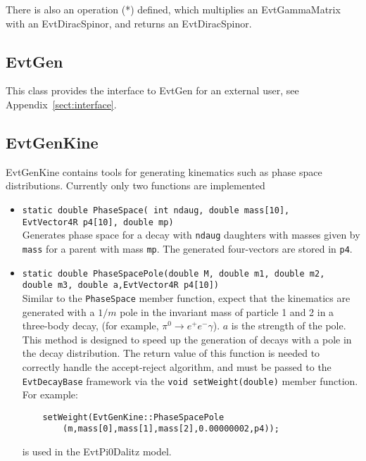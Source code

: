 There is also an operation (*) defined, which multiplies 
an EvtGammaMatrix with an EvtDiracSpinor, and returns an
EvtDiracSpinor. 


\subsection{EvtGen}


This class provides the interface to EvtGen for an external user,
see Appendix~\ref{sect:interface}.


\subsection{EvtGenKine}

EvtGenKine contains tools for generating kinematics such
as phase space distributions. Currently only two functions are
implemented

\begin{itemize}
\item {\tt static double PhaseSpace( int ndaug, double mass[10],}\\
      {\tt EvtVector4R p4[10], double mp)}\\
      Generates phase space for a decay with {\tt ndaug} daughters
      with masses given by {\tt mass} for a parent with mass {\tt mp}.
      The generated four-vectors are stored in {\tt p4}.
\item {\tt static double PhaseSpacePole(double M, double m1, double m2,}\\
      {\tt double m3, double a,EvtVector4R p4[10])}\\
      Similar to the {\tt PhaseSpace} member function, expect that
      the kinematics are generated with a $1/m$ pole in the 
      invariant mass of particle 1 and 2 in a three-body decay, 
      (for example, $\pi^0\rightarrow e^+e^-\gamma$). $a$ is the 
      strength of the pole.  This method is designed to speed up
      the generation of decays with a pole in the decay distribution.
      The return value of this function is
      needed to correctly handle the accept-reject algorithm, and 
      must be passed to the {\tt EvtDecayBase} framework via the
      {\tt void setWeight(double)} member function.  For example:
\begin{verbatim}
    setWeight(EvtGenKine::PhaseSpacePole
  	    (m,mass[0],mass[1],mass[2],0.00000002,p4));
\end{verbatim}
is used in the EvtPi0Dalitz model.

\end{itemize}

